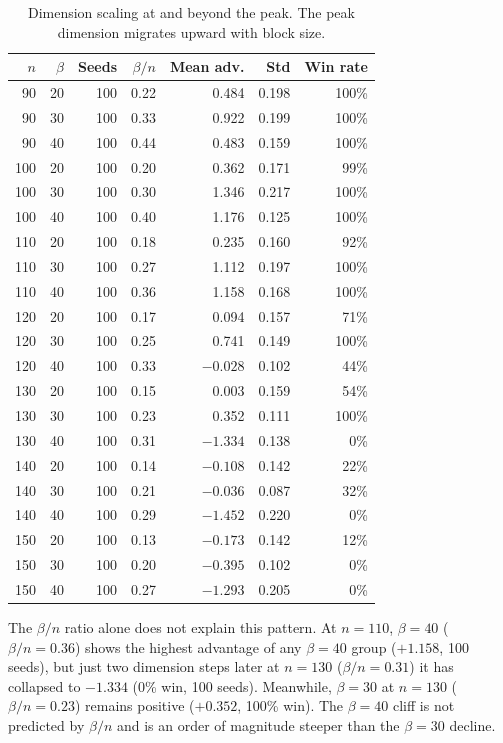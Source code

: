 \documentclass[journal=cic,version=preprint]{iacrj}
\begin{document}
\begin{table}[tbp]
\centering
\caption{Dimension scaling at and beyond the peak. The peak dimension migrates upward with block size.\label{tab:peak}}
\small
\begin{tabular}{rrrrrrr}
\hline
$n$ & $\beta$ & Seeds & $\beta/n$ & Mean adv. & Std & Win rate \\
\hline
90  & 20 & 100 & 0.22 & 0.484   & 0.198 & 100\% \\
90  & 30 & 100 & 0.33 & 0.922   & 0.199 & 100\% \\
90  & 40 & 100 & 0.44 & 0.483   & 0.159 & 100\% \\
100 & 20 & 100 & 0.20 & 0.362   & 0.171 & 99\%  \\
100 & 30 & 100 & 0.30 & 1.346   & 0.217 & 100\% \\
100 & 40 & 100 & 0.40 & 1.176   & 0.125 & 100\% \\
110 & 20 & 100 & 0.18 & 0.235   & 0.160 & 92\%  \\
110 & 30 & 100 & 0.27 & 1.112   & 0.197 & 100\% \\
110 & 40 & 100 & 0.36 & 1.158   & 0.168 & 100\% \\
120 & 20 & 100 & 0.17 & 0.094   & 0.157 & 71\%  \\
120 & 30 & 100 & 0.25 & 0.741   & 0.149 & 100\% \\
120 & 40 & 100 & 0.33 & $-0.028$ & 0.102 & 44\%  \\
130 & 20 & 100 & 0.15 & 0.003   & 0.159 & 54\%  \\
130 & 30 & 100 & 0.23 & 0.352   & 0.111 & 100\% \\
130 & 40 & 100 & 0.31 & $-1.334$ & 0.138 & 0\%   \\
140 & 20 & 100 & 0.14 & $-0.108$ & 0.142 & 22\%  \\
140 & 30 & 100 & 0.21 & $-0.036$ & 0.087 & 32\%  \\
140 & 40 & 100 & 0.29 & $-1.452$ & 0.220 & 0\%   \\
150 & 20 & 100 & 0.13 & $-0.173$ & 0.142 & 12\%  \\
150 & 30 & 100 & 0.20 & $-0.395$ & 0.102 & 0\%   \\
150 & 40 & 100 & 0.27 & $-1.293$ & 0.205 & 0\%   \\
\hline
\end{tabular}
\end{table}

The $\beta/n$ ratio alone does not explain this pattern. At $n=110$, $\beta=40$ ($\beta/n=0.36$) shows the highest advantage of any $\beta=40$ group ($+1.158$, 100 seeds), but just two dimension steps later at $n=130$ ($\beta/n=0.31$) it has collapsed to $-1.334$ (0\% win, 100 seeds). Meanwhile, $\beta=30$ at $n=130$ ($\beta/n=0.23$) remains positive ($+0.352$, 100\% win). The $\beta=40$ cliff is not predicted by $\beta/n$ and is an order of magnitude steeper than the $\beta=30$ decline.
\end{document}
